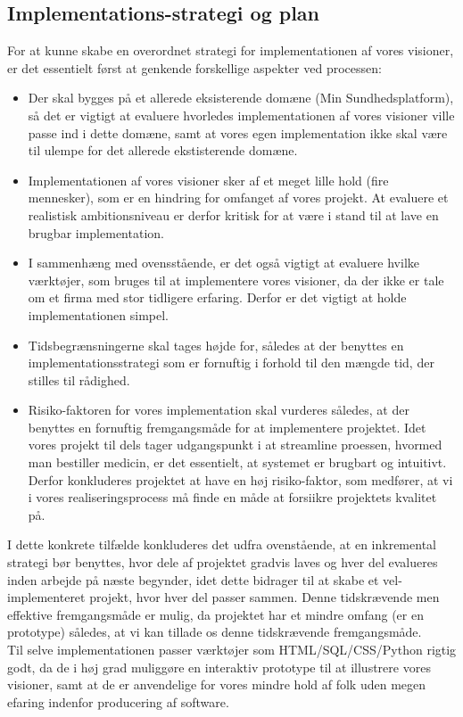 \subsection{Implementations-strategi og plan}
For at kunne skabe en overordnet strategi for implementationen af vores visioner, er det essentielt først at genkende forskellige aspekter ved processen:
\begin{itemize}
  \item Der skal bygges på et allerede eksisterende domæne (Min Sundhedsplatform), så det er vigtigt at evaluere hvorledes implementationen af vores visioner ville passe ind
    i dette domæne, samt at vores egen implementation ikke skal være til ulempe for det allerede ekstisterende domæne. 
  \item Implementationen af vores visioner sker af et meget lille hold (fire mennesker), som er en hindring for omfanget af vores projekt. At evaluere et realistisk ambitionsniveau er derfor kritisk for at være i stand til at lave en brugbar implementation. 
  \item I sammenhæng med ovensstående, er det også vigtigt at evaluere hvilke værktøjer, som bruges til at implementere vores visioner, da der ikke er tale om et firma med stor tidligere erfaring. Derfor er det vigtigt at holde implementationen simpel.
  \item Tidsbegrænsningerne skal tages højde for, således at der benyttes en implementationsstrategi som er fornuftig i forhold til den mængde tid, der stilles til rådighed.
  \item Risiko-faktoren for vores implementation skal vurderes således, at der benyttes en fornuftig fremgangsmåde for at implementere projektet. Idet vores projekt til dels tager udgangspunkt i at streamline proessen, hvormed man bestiller medicin, er det essentielt, at systemet er brugbart og intuitivt. Derfor konkluderes projektet at have en høj risiko-faktor, som medfører, at vi i vores realiseringsprocess må finde en måde at forsiikre projektets kvalitet på.
\end{itemize}

I dette konkrete tilfælde konkluderes det udfra ovenstående, at en inkremental strategi bør benyttes, hvor dele af projektet gradvis laves og hver del evalueres inden arbejde på næste begynder, idet dette bidrager til at skabe et vel-implementeret projekt, hvor hver del passer sammen. Denne tidskrævende men effektive fremgangsmåde er mulig, da projektet har et mindre omfang (er en prototype) således, at vi kan tillade os denne tidskrævende fremgangsmåde.\\
Til selve implementationen passer værktøjer som HTML/SQL/CSS/Python rigtig godt, da de i høj grad muliggøre en interaktiv prototype til at illustrere vores visioner, samt at de er anvendelige for vores mindre hold af folk uden megen efaring indenfor producering af software.


